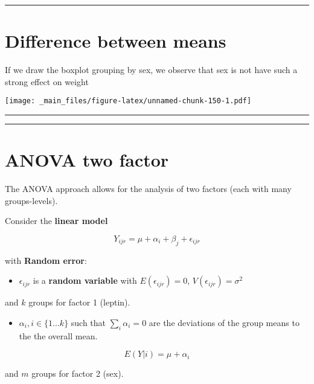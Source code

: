 \documentclass[
]{book}
\providecommand{\tightlist}{%
  \setlength{\itemsep}{0pt}\setlength{\parskip}{0pt}}
\begin{document}
\begin{center}\rule{0.5\linewidth}{0.5pt}\end{center}

\hypertarget{difference-between-means-12}{%
\section{Difference between means}\label{difference-between-means-12}}

If we draw the boxplot grouping by sex, we observe that sex is not have such a strong effect on weight

\texttt{[image: \_main\_files/figure-latex/unnamed-chunk-150-1.pdf]}

\begin{center}\rule{0.5\linewidth}{0.5pt}\end{center}

\begin{center}\rule{0.5\linewidth}{0.5pt}\end{center}

\hypertarget{anova-two-factor-1}{%
\section{ANOVA two factor}\label{anova-two-factor-1}}

The ANOVA approach allows for the analysis of two factors (each with many groups-levels).

Consider the \textbf{linear model}

\[Y_{ijr} = \mu + \alpha_i + \beta_j + \epsilon_{ijr}\]

with \textbf{Random error}:

\begin{itemize}
\tightlist
\item
  \(\epsilon_{ijr}\) is a \textbf{random variable} with \(E(\epsilon_{ijr})=0\), \(V(\epsilon_{ijr})=\sigma^2\)
\end{itemize}

and \(k\) groups for factor 1 (leptin).

\begin{itemize}
\tightlist
\item
  \(\alpha_i, i \in\{1...k\}\) such that \(\sum_i \alpha_i=0\) are the deviations of the group means to the the overall mean.
\end{itemize}

\[E(Y|i)=\mu + \alpha_i\]

and \(m\) groups for factor 2 (sex).
\end{document}
